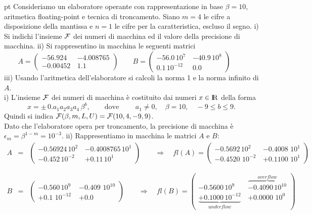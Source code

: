 \documentclass[11pt]{article}
\def\R{\hbox{\rm I\kern-.2em\hbox{\rm R}}}
\begin{document}
\vskip 10pt \noindent


\vskip 20pt
\noindent

  pt \noindent 
\vskip 20pt
\noindent
\vskip 20pt  
Consideriamo un elaboratore operante con
rappresentazione in base $\beta=10$, aritmetica floating-point e
tecnica di troncamento. Siano  $m=4$ le cifre a disposizione della mantissa
e  $n=1$ le cifre per la  caratteristica, escluso il segno.
\vskip 2pt
\noindent
i) Si indichi l'insieme ${\cal F}$ dei numeri di macchina ed il valore della precisione di macchina.
\vskip 2pt    \noindent
ii) Si  rappresentino in macchina   le seguenti matrici
$$
A=
\left(
\begin{array}{rr}
-56.924 \,& -4.008765\\
-0.00452 \,&  1.1
\end{array}
\right)
\quad \quad
B=
\left(
\begin{array}{rr}
-56.0\, 10^7\, & -40.9\, 10^8\\
0.1\, 10^{-12} \,&  0.0
\end{array}
\right)
\quad \quad
$$
\vskip 2pt    \noindent
iii)
Usando l'aritmetica dell'elaboratore  si calcoli la norma 1 e la norma infinito di $A$.
\medskip {}
\\
i)   L'insieme  ${\cal F}$ dei numeri di macchina  \`e  costituito dai numeri
$x\in \R$ della forma
$$
x=\pm \, 0.a_1a_2a_3a_4\, \beta^b, \quad \quad \mbox{dove }\quad \quad  a_1\neq 0, \quad \beta=10, \quad
 -9\le b\le 9.
$$
Quindi si indica ${\cal F}(\beta, m, L, U)={\cal F}(10, 4, -9, 9)$.
\\
Dato che l'elaboratore opera per troncamento, la precisione di macchina
\`e $\epsilon_m=\beta^{1-m}=10^{-3}$.
\vskip 4pt
\noindent
ii) Rappresentiamo in macchina   le matrici $A$ e $B$:
\begin{eqnarray}
A&=&
\left(
\begin{array}{ll}
-0.56924\, 10^2 \,& -0.4008765\, 10^1\\
-0.452\, 10^{-2}  \,&  +0.11  \, 10^1
\end{array}
\right)
\quad \quad  \Rightarrow  \quad fl(A)=\left(
\begin{array}{ll}
-0.5692\, 10^2 \,& -0.4008\,\, 10^1\\
-0.4520\, \,10^{-2}  \,&  +0.1100 \, \, 10^1
\end{array}
\right)    \nonumber \\
& & \nonumber \\
& & \nonumber \\
B&=&
\left(
\begin{array}{ll}
-0.560\, 10^9\,\, & -0.409\,\, 10^{10} \\
+0.1\,\, 10^{-12}  &  +0.0
\end{array}
\right)  \quad \quad   \Rightarrow \quad fl(B)= \left(
\begin{array}{ll}
-0.5600\, 10^9\, & \overbrace{-0.4090\, 10^{10}}^{overflow} \\
\underbrace{+0.1000\, 10^{-12}  }_{underflow}\,&  +0.0000\,\,10^0
\end{array}
\right)   \nonumber
\end{eqnarray}
\end{document}
